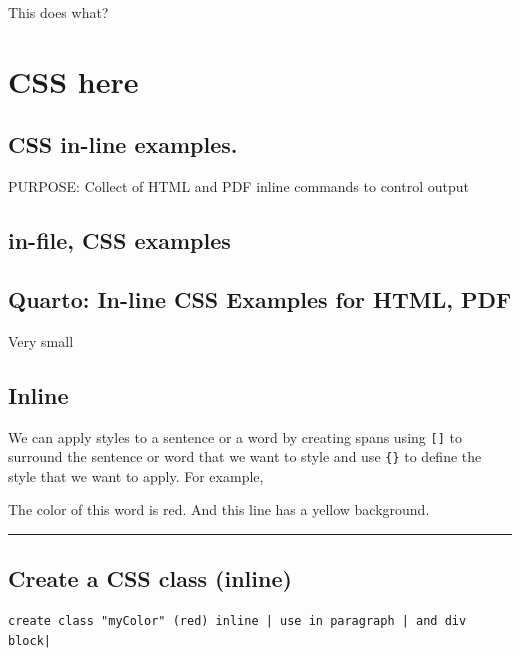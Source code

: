 \documentclass[
]{report}
\begin{document}
\protect{}\label{special}
This does what?

\section{CSS here}\label{css-here}

\subsection{CSS in-line examples.}\label{css-in-line-examples.}

PURPOSE: Collect of HTML and PDF inline commands to control output

\subsection{in-file, CSS examples}\label{in-file-css-examples}

\subsection{Quarto: In-line CSS Examples for HTML,
PDF}\label{quarto-in-line-css-examples-for-html-pdf}

Very small

\subsection{Inline}\label{inline}

We can apply styles to a sentence or a word by creating spans using
\texttt{{[}{]}} to surround the sentence or word that we want to style
and use \texttt{\{\}} to define the style that we want to apply. For
example,

The color of this word is {red}. And {this line has a yellow
background}.

\begin{center}\rule{0.5\linewidth}{0.5pt}\end{center}

\subsection{Create a CSS class
(inline)}\label{create-a-css-class-inline}

\begin{verbatim}
create class "myColor" (red) inline | use in paragraph | and div block| 
\end{verbatim}
\end{document}
